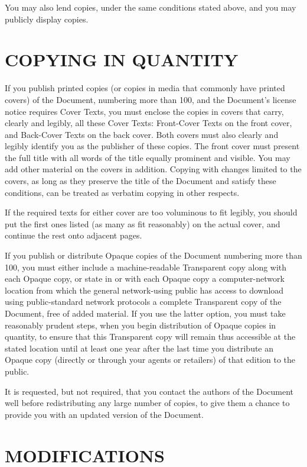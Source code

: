 \documentclass[10pt,a4paper,titlepage,twoside,openright]{report}
\begin{document}
You may also lend copies, under the same conditions stated above, and
you may publicly display copies.


\section*{COPYING IN QUANTITY}
\label{copying}

If you publish printed copies (or copies in media that commonly have
printed covers) of the Document, numbering more than 100, and the
Document's license notice requires Cover Texts, you must enclose the
copies in covers that carry, clearly and legibly, all these Cover
Texts: Front-Cover Texts on the front cover, and Back-Cover Texts on
the back cover.  Both covers must also clearly and legibly identify
you as the publisher of these copies.  The front cover must present
the full title with all words of the title equally prominent and
visible.  You may add other material on the covers in addition.
Copying with changes limited to the covers, as long as they preserve
the title of the Document and satisfy these conditions, can be treated
as verbatim copying in other respects.

If the required texts for either cover are too voluminous to fit
legibly, you should put the first ones listed (as many as fit
reasonably) on the actual cover, and continue the rest onto adjacent
pages.

If you publish or distribute Opaque copies of the Document numbering
more than 100, you must either include a machine-readable Transparent
copy along with each Opaque copy, or state in or with each Opaque copy
a computer-network location from which the general network-using
public has access to download using public-standard network protocols
a complete Transparent copy of the Document, free of added material.
If you use the latter option, you must take reasonably prudent steps,
when you begin distribution of Opaque copies in quantity, to ensure
that this Transparent copy will remain thus accessible at the stated
location until at least one year after the last time you distribute an
Opaque copy (directly or through your agents or retailers) of that
edition to the public.

It is requested, but not required, that you contact the authors of the
Document well before redistributing any large number of copies, to give
them a chance to provide you with an updated version of the Document.


\section*{MODIFICATIONS}
\label{modifications}
\end{document}
